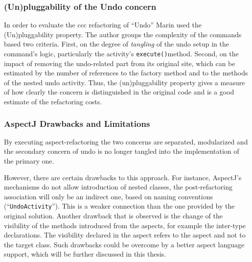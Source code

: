 \subsubsection{(Un)pluggability of the Undo concern}
In order to evaluate the \ac{ccc} refactoring of ``Undo'' Marin \cite{marin2004refactoring} used the (Un)pluggability property. The author groups the complexity of the commands based two criteria.
First, on the degree of \textit{tangling} of the undo setup in the command's logic, particularly the activity's \texttt{execute()}method. 
Second, on the impact of removing the undo-related part from its original site, which can be estimated by the number of references to the factory method and to the methods of the nested undo activity.
Thus, the (un)pluggability property gives a measure of how clearly the concern is distinguished in the original code and is a good estimate of the refactoring costs.

\subsubsection{AspectJ Drawbacks and Limitations}
By executing aspect-refactoring the two concerns are separated, modularized and the secondary concern of undo is no longer tangled into the implementation of the primary one.

However, there are certain drawbacks to this approach.
For instance, AspectJ's mechanisms do not allow introduction of nested classes, the post-refactoring association will only be an indirect one, based on naming conventions (``\texttt{UndoActivity}''). 
This is a weaker connection than the one provided by the original solution. 
Another drawback that is observed is the change of the visibility of the methods introduced from the aspects, for example the inter-type declarations. 
The visibility declared in the aspect refers to the aspect and not to the target class. 
Such drawbacks could be overcome by a better aspect language support, which will be further discussed in this thesis.

